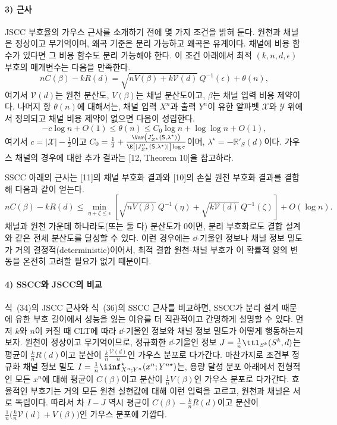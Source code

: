 \paragraph{3) 근사}
JSCC 부호율의 가우스 근사를 소개하기 전에 몇 가지 조건을 밝혀 둔다. 원천과 채널은 정상이고 무기억이며, 왜곡 기준은 분리 가능하고 왜곡은 유계이다. 채널에 비용 함수가 있다면 그 비용 함수도 분리 가능해야 한다. 이 조건 아래에서 최적 $(k,n,d,\epsilon)$ 부호의 매개변수는 다음을 만족한다.
\begin{equation}
nC(\beta)-kR(d)=\sqrt{nV(\beta)+k\mathcal{V}(d)}\,Q^{-1}(\epsilon)+\theta(n),
\tag{34}
\end{equation}
여기서 $\mathcal{V}(d)$는 원천 분산도, $V(\beta)$는 채널 분산도이고, $\beta$는 채널 입력 비용 제약이다. 나머지 항 $\theta(n)$에 대해서는, 채널 입력 $X^n$과 출력 $Y^n$이 유한 알파벳 $\mathcal{X}$와 $\mathcal{Y}$ 위에서 정의되고 채널 비용 제약이 없으면 다음이 성립한다.
\begin{equation}
-c\log n+O(1)\le\theta(n)\le C_0\log n+\log\log n+O(1),
\tag{35}
\end{equation}
여기서 $c=|\mathcal{X}|-\frac{1}{2}$이고 $C_0=\frac{1}{2}+\frac{\Var\left(J'_{Z^\star}(\mathsf{S},\lambda^\star)\right)}{\E\left[|J''_{Z^\star}(\mathsf{S},\lambda^\star)|\right]\log e}$이며, $\lambda^\star=-\mathbb{R}'_{S}(d)$이다. 가우스 채널의 경우에 대한 추가 결과는 [12, Theorem 10]을 참고하라.

SSCC 아래의 근사는 [11]의 채널 부호화 결과와 [10]의 손실 원천 부호화 결과를 결합해 다음과 같이 얻는다.
\begin{equation}
nC(\beta)-kR(d)\le\min_{\eta+\zeta\le\epsilon}\left[\sqrt{nV(\beta)}\,Q^{-1}(\eta)+\sqrt{k\mathcal{V}(d)}\,Q^{-1}(\zeta)\right]+O(\log n).
\tag{36}
\end{equation}
채널과 원천 가운데 하나라도(또는 둘 다) 분산도가 0이면, 분리 부호화로도 결합 설계와 같은 전체 분산도를 달성할 수 있다. 이런 경우에는 $\dd$-기울인 정보나 채널 정보 밀도가 거의 결정적(deterministic)이어서, 최적 결합 원천-채널 부호가 이 확률적 양의 변동을 온전히 고려할 필요가 없기 때문이다.

\paragraph{4) SSCC와 JSCC의 비교}
식~(34)의 JSCC 근사와 식~(36)의 SSCC 근사를 비교하면, SSCC가 분리 설계 때문에 유한 부호 길이에서 성능을 잃는 이유를 더 직관적이고 간명하게 설명할 수 있다. 먼저 $k$와 $n$이 커질 때 CLT에 따라 $\dd$-기울인 정보와 채널 정보 밀도가 어떻게 행동하는지 보자. 원천이 정상이고 무기억이므로, 정규화한 $\dd$-기울인 정보 $J=\frac{1}{n}\ttl_{S^k}(S^k,d)$는 평균이 $\frac{k}{n}R(d)$이고 분산이 $\frac{k}{n}\frac{\mathcal{V}(d)}{n}$인 가우스 분포로 다가간다. 마찬가지로 조건부 정규화 채널 정보 밀도 $I=\frac{1}{n}\iinf^\star_{X^n;Y^n}(x^n;Y^{n\star})$는, 용량 달성 분포 아래에서 전형적인 모든 $x^n$에 대해 평균이 $C(\beta)$이고 분산이 $\frac{1}{n}V(\beta)$인 가우스 분포로 다가간다. 효율적인 부호기는 거의 모든 원천 실현값에 대해 이런 입력을 고르고, 원천과 채널은 서로 독립이다. 따라서 차 $I-J$ 역시 평균이 $C(\beta)-\frac{k}{n}R(d)$이고 분산이 $\frac{1}{n}\bigl(\frac{k}{n}\mathcal{V}(d)+V(\beta)\bigr)$인 가우스 분포에 가깝다.

